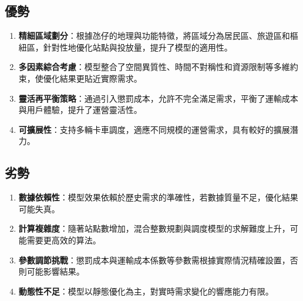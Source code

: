 \subsection{優勢}
\begin{enumerate}
    \item \textbf{精細區域劃分}：根據氹仔的地理與功能特徵，將區域分為居民區、旅遊區和樞紐區，針對性地優化站點與投放量，提升了模型的適用性。
    \item \textbf{多因素綜合考慮}：模型整合了空間異質性、時間不對稱性和資源限制等多維約束，使優化結果更貼近實際需求。
    \item \textbf{靈活再平衡策略}：通過引入懲罰成本，允許不完全滿足需求，平衡了運輸成本與用戶體驗，提升了運營靈活性。
    \item \textbf{可擴展性}：支持多輛卡車調度，適應不同規模的運營需求，具有較好的擴展潛力。
\end{enumerate}

\subsection{劣勢}
\begin{enumerate}
    \item \textbf{數據依賴性}：模型效果依賴於歷史需求的準確性，若數據質量不足，優化結果可能失真。
    \item \textbf{計算複雜度}：隨著站點數增加，混合整數規劃與調度模型的求解難度上升，可能需要更高效的算法。
    \item \textbf{參數調節挑戰}：懲罰成本與運輸成本係數等參數需根據實際情況精確設置，否則可能影響結果。
    \item \textbf{動態性不足}：模型以靜態優化為主，對實時需求變化的響應能力有限。
\end{enumerate}
